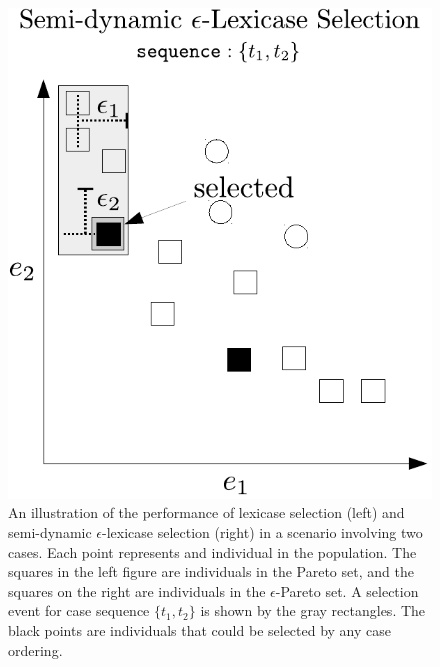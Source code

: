 \documentclass[twoside]{article}
\begin{document}
\begin{figure}[htb]
\begin{minipage}{0.49\textwidth}
  \includegraphics[width = \textwidth]{figs/ep-lex_pareto2.pdf}
  
\end{minipage}
\caption{An illustration of the performance of lexicase selection (left) and semi-dynamic $\epsilon$-lexicase selection (right) in a scenario involving two cases. Each point represents and individual in the population. The squares in the left figure are individuals in the Pareto set, and the squares on the right are individuals in the $\epsilon$-Pareto set. A selection event for case sequence $\{t_1,t_2\}$ is shown by the gray rectangles. The black points are individuals that could be selected by any case ordering.}\label{fig:lex_pareto}
\end{figure}
\end{document}
